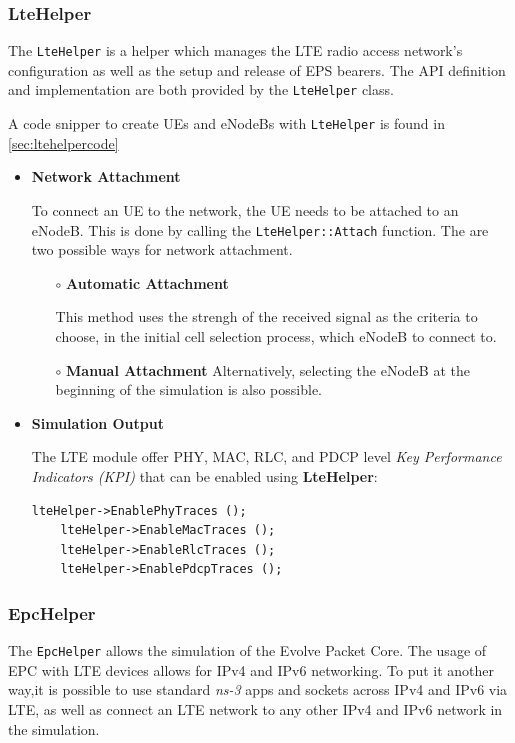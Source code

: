 \subsubsection{LteHelper}
The \texttt{LteHelper} is a helper which manages the LTE radio access network's 
configuration as well as the setup and release of EPS bearers. The API definition and 
implementation are both provided by the \texttt{LteHelper} class.

A code snipper to create UEs and eNodeBs with \texttt{LteHelper} is found in \autoref{sec:ltehelpercode}

\begin{itemize}
  \item \textbf{Network Attachment}
  
  To connect an UE to the network, the UE needs to be attached to an eNodeB. This is done by calling the
  \texttt{LteHelper::Attach} function. The are two possible ways for network attachment.

  \begin{itemize}
    \item[$\circ$] \textbf{Automatic Attachment}

    This method uses the strengh of the received signal as the criteria to choose, 
    in the initial cell selection process, which eNodeB to connect to.
    
    \item[$\circ$] \textbf{Manual Attachment}
    Alternatively, selecting the eNodeB at the beginning of the simulation is also possible.

  \end{itemize}

  \item \textbf{Simulation Output}
  
  The LTE module offer PHY, MAC, RLC, and PDCP level \textit{Key Performance Indicators (KPI)}
  that can be enabled using \textbf{LteHelper}:

  \begin{lstlisting}[language=myC++,caption={Enable LTE trace outputs}, captionpos=b]
    lteHelper->EnablePhyTraces ();
    lteHelper->EnableMacTraces ();
    lteHelper->EnableRlcTraces ();
    lteHelper->EnablePdcpTraces ();
  \end{lstlisting}
\end{itemize}

\subsubsection{EpcHelper}
The \texttt{EpcHelper} allows the simulation of the Evolve Packet Core. The usage of EPC with 
LTE devices allows for IPv4 and IPv6 networking. To put it another way,it is possible to use 
standard \textit{ns-3} apps and sockets across IPv4 and IPv6 via LTE, as well as connect an LTE network 
to any other IPv4 and IPv6 network in the simulation.

